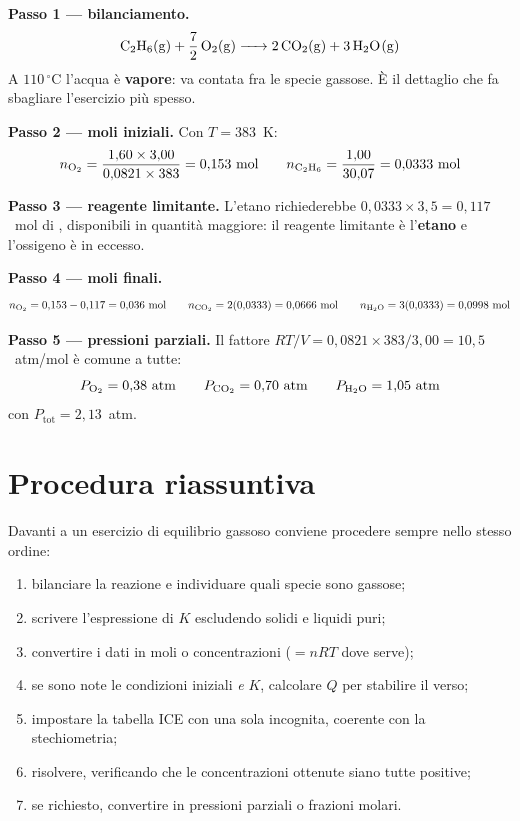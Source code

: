 \documentclass[11pt, a4paper, openright]{book}
\begin{document}
\medskip
\noindent\textbf{Passo 1 --- bilanciamento.}
\begin{equation*}
  \ce{C2H6(g) + 7/2 O2(g) -> 2 CO2(g) + 3 H2O(g)}
\end{equation*}
A $110\,^\circ$C l'acqua è \textbf{vapore}: va contata fra le specie gassose. È il
dettaglio che fa sbagliare l'esercizio più spesso.

\medskip
\noindent\textbf{Passo 2 --- moli iniziali.} Con $T = 383$~K:
\begin{equation*}
  n_{\ce{O2}} = \frac{1{,}60 \times 3{,}00}{0{,}0821 \times 383} = 0{,}153 \ \text{mol}
  \qquad
  n_{\ce{C2H6}} = \frac{1{,}00}{30{,}07} = 0{,}0333 \ \text{mol}
\end{equation*}

\noindent\textbf{Passo 3 --- reagente limitante.} L'etano richiederebbe
$0{,}0333 \times 3{,}5 = 0{,}117$~mol di , disponibili in quantità maggiore: il
reagente limitante è l'\textbf{etano} e l'ossigeno è in eccesso.

\medskip
\noindent\textbf{Passo 4 --- moli finali.}
\begin{equation*}
  n_{\ce{O2}} = 0{,}153 - 0{,}117 = 0{,}036 \ \text{mol}
  \qquad
  n_{\ce{CO2}} = 2(0{,}0333) = 0{,}0666 \ \text{mol}
  \qquad
  n_{\ce{H2O}} = 3(0{,}0333) = 0{,}0998 \ \text{mol}
\end{equation*}

\noindent\textbf{Passo 5 --- pressioni parziali.} Il fattore $RT/V = 0{,}0821 \times 383 / 3{,}00
= 10{,}5$~atm/mol è comune a tutte:
\begin{equation*}
  P_{\ce{O2}} = 0{,}38 \ \text{atm}
  \qquad
  P_{\ce{CO2}} = 0{,}70 \ \text{atm}
  \qquad
  P_{\ce{H2O}} = 1{,}05 \ \text{atm}
\end{equation*}
con $P_{\text{tot}} = 2{,}13$~atm.


\section{Procedura riassuntiva}

Davanti a un esercizio di equilibrio gassoso conviene procedere sempre nello stesso ordine:

\begin{enumerate}
  \item bilanciare la reazione e individuare quali specie sono gassose;
  \item scrivere l'espressione di $K$ escludendo solidi e liquidi puri;
  \item convertire i dati in moli o concentrazioni ($= nRT$ dove serve);
  \item se sono note le condizioni iniziali \emph{e} $K$, calcolare $Q$ per stabilire il verso;
  \item impostare la tabella ICE con una sola incognita, coerente con la stechiometria;
  \item risolvere, verificando che le concentrazioni ottenute siano tutte positive;
  \item se richiesto, convertire in pressioni parziali o frazioni molari.
\end{enumerate}
\end{document}
